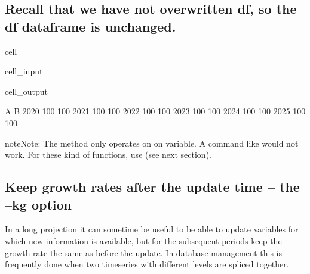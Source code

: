 \documentclass[letterpaper,10pt,english]{jupyterBook}
\begin{document}
\subsection{Recall  that we have not overwritten df, so the df dataframe is unchanged.}
\label{\detokenize{content/04_PythonEssentials/UpdateCommand:recall-that-we-have-not-overwritten-df-so-the-df-dataframe-is-unchanged}}
\begin{sphinxuseclass}{cell}\begin{sphinxVerbatimInput}

\begin{sphinxuseclass}{cell_input}
\begin{sphinxVerbatim}[commandchars=\\\{\}]
\end{sphinxVerbatim}

\end{sphinxuseclass}\end{sphinxVerbatimInput}
\begin{sphinxVerbatimOutput}

\begin{sphinxuseclass}{cell_output}
\begin{sphinxVerbatim}[commandchars=\\\{\}]
        A    B
2020  100  100
2021  100  100
2022  100  100
2023  100  100
2024  100  100
2025  100  100
\end{sphinxVerbatim}

\end{sphinxuseclass}\end{sphinxVerbatimOutput}

\end{sphinxuseclass}
\begin{sphinxadmonition}{note}{Note:}
\sphinxAtStartPar
The method  only operates on on variable.  A command like  would not work. For these kind of functions, use  (see next section).
\end{sphinxadmonition}


\subsection{Keep growth rates after the update time – the –kg option}
\label{\detokenize{content/04_PythonEssentials/UpdateCommand:keep-growth-rates-after-the-update-time-the-kg-option}}
\sphinxAtStartPar
In a long projection it can sometime be useful to be able to update variables for which new information is available, but for the subsequent periods keep the growth rate the same as before the update. In database management this is frequently done when two time\sphinxhyphen{}series with different levels are spliced together.
\end{document}

